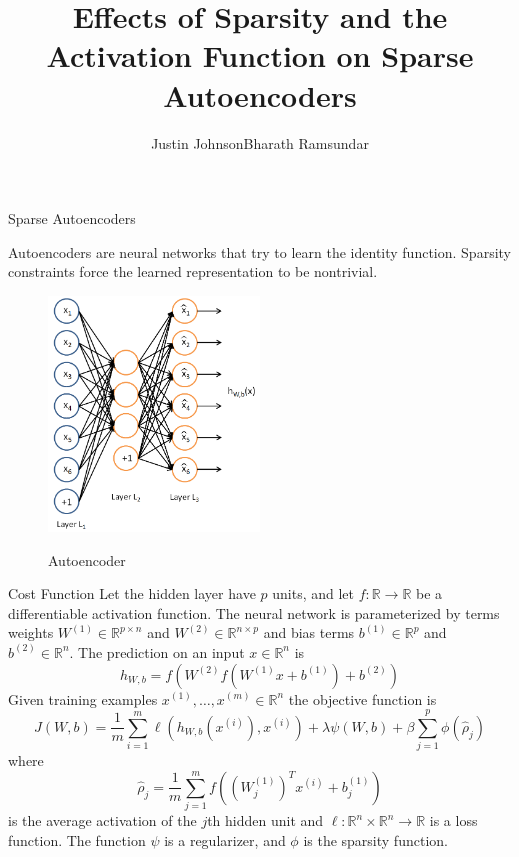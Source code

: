 \documentclass{beamer}
\title[]{Effects of Sparsity and the Activation Function on Sparse Autoencoders}
\author[]{Justin Johnson\quad Bharath Ramsundar}
\date{}
\newcommand{\RR}{\mathbb{R}}
\newcommand{\ra}{\rightarrow}
\newcommand{\Wo}{W^{(1)}}
\newcommand{\Wt}{W^{(2)}}
\newcommand{\bo}{b^{(1)}}
\newcommand{\bt}{b^{(2)}}
\newcommand{\xii}{x^{(i)}}
\begin{document}
\begin{frame}
\maketitle
\end{frame}

\begin{frame}{Sparse Autoencoders}

Autoencoders are neural networks that try to learn the identity function.
Sparsity constraints force the learned representation to be nontrivial.

\begin{figure}[htb]
\begin{center}
\label{proc_sched}
\includegraphics[width=0.5\textwidth]{Autoencoder636.png}
\caption{Autoencoder}
\end{center}
\end{figure}

\end{frame}
\begin{frame}{Cost Function}
\small
Let the hidden layer have $p$ units, and let $f:\RR\ra\RR$ be a differentiable
activation function. The neural network is parameterized by terms weights
$\Wo\in\RR^{p\times n}$ and $\Wt\in\RR^{n\times p}$ and bias terms $\bo\in\RR^p$
and $\bt\in\RR^n$. The prediction on an input
$x\in\RR^n$ is
\[h_{W,b}=f(\Wt f(\Wo x+\bo)+\bt)\]
Given training examples $x^{(1)},\ldots,x^{(m)}\in\RR^n$ the objective function is
\[J(W,b)=\frac1m\sum_{i=1}^m\ell(h_{W,b}(\xii),\xii)+\lambda\psi(W,b)+\beta\sum_{j=1}^p\phi(\hat\rho_j)\]
where 
\[\hat\rho_j=\frac1m\sum_{j=1}^mf\left((\Wo_j)^T\xii+\bo_j\right)\] is 
the average activation of the $j$th hidden unit and
$\ell:\RR^n\times\RR^n\ra\RR$ is a loss function. The function $\psi$ is a
regularizer, and $\phi$ is the sparsity function.
\normalsize
\end{frame}
\end{document}
